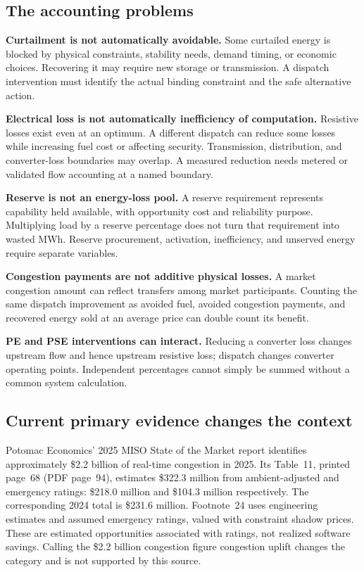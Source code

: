 \documentclass[11pt,letterpaper]{article}
\begin{document}
\subsection{The accounting problems}
\textbf{Curtailment is not automatically avoidable.} Some curtailed energy is blocked by physical constraints, stability needs, demand timing, or economic choices. Recovering it may require new storage or transmission. A dispatch intervention must identify the actual binding constraint and the safe alternative action.

\textbf{Electrical loss is not automatically inefficiency of computation.} Resistive losses exist even at an optimum. A different dispatch can reduce some losses while increasing fuel cost or affecting security. Transmission, distribution, and converter-loss boundaries may overlap. A measured reduction needs metered or validated flow accounting at a named boundary.

\textbf{Reserve is not an energy-loss pool.} A reserve requirement represents capability held available, with opportunity cost and reliability purpose. Multiplying load by a reserve percentage does not turn that requirement into wasted MWh. Reserve procurement, activation, inefficiency, and unserved energy require separate variables.

\textbf{Congestion payments are not additive physical losses.} A market congestion amount can reflect transfers among market participants. Counting the same dispatch improvement as avoided fuel, avoided congestion payments, and recovered energy sold at an average price can double count its benefit.

\textbf{PE and PSE interventions can interact.} Reducing a converter loss changes upstream flow and hence upstream resistive loss; dispatch changes converter operating points. Independent percentages cannot simply be summed without a common system calculation.

\subsection{Current primary evidence changes the context}
Potomac Economics' 2025 MISO State of the Market report identifies approximately \$2.2 billion of real-time congestion in 2025. Its Table~11, printed page~68 (PDF page~94), estimates \$322.3 million from ambient-adjusted and emergency ratings: \$218.0 million and \$104.3 million respectively. The corresponding 2024 total is \$231.6 million. Footnote~24 uses engineering estimates and assumed emergency ratings, valued with constraint shadow prices. These are estimated opportunities associated with ratings, not realized software savings. Calling the \$2.2 billion congestion figure congestion uplift changes the category and is not supported by this source.\cite{miso}
\end{document}
